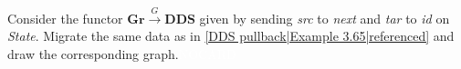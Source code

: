 
Consider the functor $\mathbf{Gr}\xrightarrow{G}\mathbf{DDS}$ given by sending \emph{src} to \emph{next} and \emph{tar} to \emph{id} on \emph{State}. Migrate the same data as in \ref{DDS pullback|Example 3.65|referenced} and draw the corresponding graph.\textcolor{white}{NOCARD}